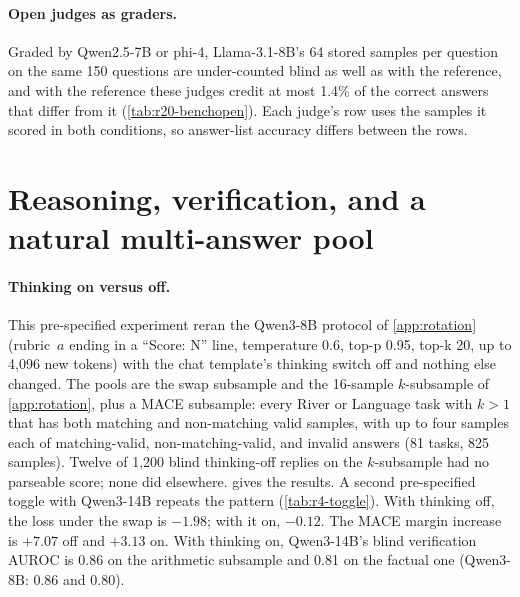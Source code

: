 \paragraph{Open judges as graders.}
Graded by Qwen2.5-7B or phi-4, Llama-3.1-8B's 64 stored samples per question on the same 150 questions are under-counted blind as well as with the reference, and with the reference these judges credit at most 1.4\% of the correct answers that differ from it (\cref{tab:r20-benchopen}).\ph{} Each judge's row uses the samples it scored in both conditions, so answer-list accuracy differs between the rows.

\begin{table}[htbp]
\centering
\caption{Open judges as graders of Llama-3.1-8B's stored samples on the 150 multi-answer \textsc{MACE} questions (a score of 7 or above counts as correct; question-level bootstrap).\ph}
\label{tab:r20-benchopen}
\footnotesize

\end{table}

\FloatBarrier
\section{Reasoning, verification, and a natural multi-answer pool}
\label{app:reasoning}

\paragraph{Thinking on versus off.}
This pre-specified experiment reran the Qwen3-8B protocol of \cref{app:rotation} (rubric~$a$ ending in a ``Score: N'' line, temperature 0.6, top-p 0.95, top-k 20, up to 4,096 new tokens) with the chat template's thinking switch off and nothing else changed. The pools are the swap subsample and the 16-sample $k$-subsample of \cref{app:rotation}, plus a \textsc{MACE} subsample: every River or Language task with $k{>}1$ that has both matching and non-matching valid samples, with up to four samples each of matching-valid, non-matching-valid, and invalid answers (81 tasks, 825 samples). Twelve of 1,200 blind thinking-off replies on the $k$-subsample had no parseable score; none did elsewhere.  gives the results. A second pre-specified toggle with Qwen3-14B repeats the pattern (\cref{tab:r4-toggle}). With thinking off, the loss under the swap is $-1.98$; with it on, $-0.12$. The \textsc{MACE} margin increase is $+7.07$ off and $+3.13$ on. With thinking on, Qwen3-14B's blind verification AUROC is 0.86 on the arithmetic subsample and 0.81 on the factual one (Qwen3-8B: 0.86 and 0.80).

